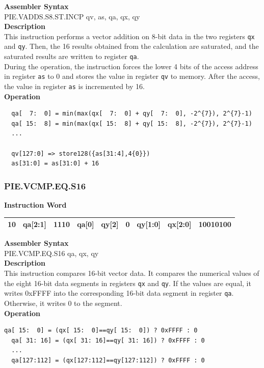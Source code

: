 \textbf{Assembler Syntax} \\
PIE.VADDS.S8.ST.INCP qv, as, qa, qx, qy \\
\textbf{Description} \\
This instruction performs a vector addition on 8-bit data in the two registers \lstinline{qx} and \lstinline{qy}. Then, the 16 results obtained from the calculation are saturated, and the saturated results are written to register \lstinline{qa}. \\ During the operation, the instruction forces the lower 4 bits of the access address in register \lstinline{as} to 0 and stores the value in register \lstinline{qv} to memory. After the access, the value in register \lstinline{as} is incremented by 16.\\
\textbf{Operation}
\begin{lstlisting}
  qa[  7:  0] = min(max(qx[  7:  0] + qy[  7:  0], -2^{7}), 2^{7}-1)
  qa[ 15:  8] = min(max(qx[ 15:  8] + qy[ 15:  8], -2^{7}), 2^{7}-1)
  ...

  qv[127:0] => store128({as[31:4],4{0}})
  as[31:0] = as[31:0] + 16
\end{lstlisting}

\newpage
\subsubsection{PIE.VCMP.EQ.S16}\label{instruction:PIEVCMPEQS16}
\setlength\tabcolsep{6pt}
\textbf{Instruction Word} \\
\begin{tabular}{|c|c|c|c|c|c|c|c|c|}
	\hline
	10 & qa[2:1] & 1110 & qa[0] & qy[2] & 0 & qy[1:0] & qx[2:0] & 10010100 \\
	\hline
\end{tabular}

\textbf{Assembler Syntax} \\
PIE.VCMP.EQ.S16 qa, qx, qy \\
\textbf{Description} \\
This instruction compares 16-bit vector data. It compares the numerical values of the eight 16-bit data segments in registers \lstinline{qx} and \lstinline{qy}. If the values are equal, it writes 0xFFFF into the corresponding 16-bit data segment in register \lstinline{qa}. Otherwise, it writes 0 to the segment.\\
\textbf{Operation}
\begin{lstlisting}[escapeinside=`?]
  qa[ 15:  0] = (qx[ 15:  0]==qy[ 15:  0]) ? 0xFFFF : 0
  qa[ 31: 16] = (qx[ 31: 16]==qy[ 31: 16]) ? 0xFFFF : 0
  ...
  qa[127:112] = (qx[127:112]==qy[127:112]) ? 0xFFFF : 0
\end{lstlisting}


